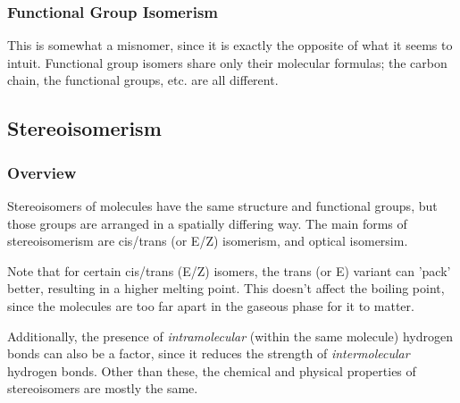 


	\pagebreak
	\subsubsection{Functional Group Isomerism}
		This is somewhat a misnomer, since it is exactly the opposite of what it seems to intuit. Functional group isomers
		share only their molecular formulas; the carbon chain, the functional groups, etc. are all different.






\subsection{Stereoisomerism}

	\subsubsection{Overview}
	Stereoisomers of molecules have the same structure and functional groups, but those groups are arranged in a spatially
	differing way. The main forms of stereoisomerism are cis/trans (or E/Z) isomerism, and optical isomersim.

	Note that for certain cis/trans (E/Z) isomers, the trans (or E) variant can 'pack' better, resulting in a higher melting
	point. This doesn't affect the boiling point, since the molecules are too far apart in the gaseous phase for it to matter.

	Additionally, the presence of \textit{intramolecular} (within the same molecule) hydrogen bonds can also be a factor, since
	it reduces the strength of \textit{intermolecular} hydrogen bonds. Other than these, the chemical and physical properties of
	stereoisomers are mostly the same.


	\pagebreak

